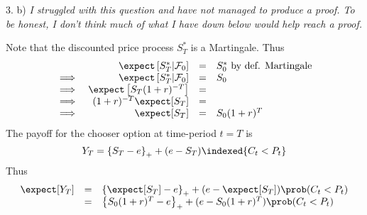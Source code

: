 \documentclass[11pt,a4paper]{article}
\begin{document}
\begin{answer}{3. b)}
  \textit{I struggled with this question and have not managed to produce a proof. To be honest, I don't think much of what I have down below would help reach a proof.}
  \par Note that the discounted price process $S_T^*$ is a Martingale. Thus
  \[\begin{array}{rrcl}
    &\expect\left[S_T^*|\mathcal{F}_0\right]&=&S_0^*\text{ by def. Martingale}\\
    \implies&\expect\left[S_T^*|\mathcal{F}_0\right]&=&S_0\\
    \implies&\expect\left[S_T(1+r)^{-T}\right]&=&\\
    \implies&(1+r)^{-T}\expect[S_T]&=&\\
    \implies&\expect[S_T]&=&S_0(1+r)^T
  \end{array}\]
  The payoff for the chooser option at time-period $t=T$ is
  \[ Y_T=\left\{S_T-e\right\}_++(e-S_T)\indexed\{C_t<P_t\} \]
  Thus
  \[\begin{array}{rcl}
    \expect[Y_T]&=&\left\{\expect[S_T]-e\right\}_++(e-\expect[S_T])\prob(C_t<P_t)\\
    &=&\left\{S_0(1+r)^T-e\right\}_++(e-S_0(1+r)^T)\prob(C_t<P_t)
  \end{array}\]
\end{answer}
\end{document}
